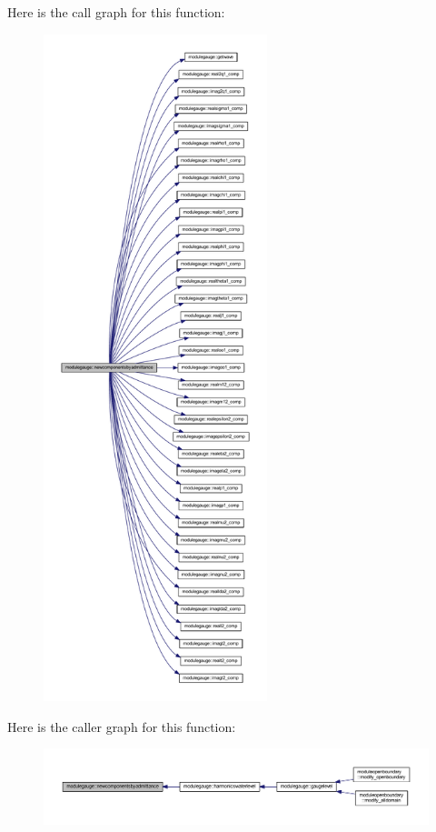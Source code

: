 Here is the call graph for this function\+:\nopagebreak
\begin{figure}[H]
\begin{center}
\leavevmode
\includegraphics[height=550pt]{namespacemodulegauge_a595eb00804040bb46c4684d46b5ed2eb_cgraph}
\end{center}
\end{figure}
Here is the caller graph for this function\+:\nopagebreak
\begin{figure}[H]
\begin{center}
\leavevmode
\includegraphics[width=350pt]{namespacemodulegauge_a595eb00804040bb46c4684d46b5ed2eb_icgraph}
\end{center}
\end{figure}
\mbox{\label{namespacemodulegauge_ac754b86d90578ff131adeb4a3ac03dc5}} 
